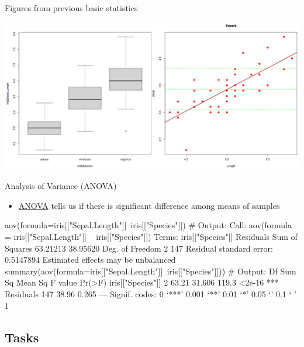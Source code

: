 \documentclass[compress, ucs, xelatex, 11pt, xcolor=svgnames, aspectratio=169,
	hyperref={
		bookmarks=true,
		unicode=true,
		colorlinks=true,
		pdftitle={Molecular data in R},
		plainpages=false,
		pdfauthor={Vojtech Zeisek},
		pdfsubject={Course about phylogeny and evolution in R},
		pdfcreator={XeLaTeX},
		pdfkeywords={R, evolution, phylogeny, molecular data},
		linkcolor=Crimson, %
		anchorcolor=Magenta, %
		citecolor=Magenta, %
		filecolor=Magenta, %
		menucolor=Magenta, %
		urlcolor=DodgerBlue, %
		pdftex},
	url={hyphens, lowtilde} %
	]{beamer}
\begin{document}
\begin{frame}{Figures from previous basic statistics}
	\begin{center}
		\includegraphics[width=\textwidth-2cm]{iris.png}
	\end{center}
\end{frame}

\begin{frame}[fragile]{Analysis of Variance (ANOVA)}
	\begin{itemize}
		\item \href{https://en.wikipedia.org/wiki/Analysis_of_variance}{ANOVA} tells us if there is significant difference among means of samples
	\end{itemize}
	\begin{spluscode}
    aov(formula=iris[["Sepal.Length"]]~iris[["Species"]]) # Output:
    Call:
       aov(formula = iris[["Sepal.Length"]] ~ iris[["Species"]])
    Terms:
                    iris[["Species"]] Residuals
    Sum of Squares           63.21213  38.95620
    Deg. of Freedom                 2       147
    Residual standard error: 0.5147894
    Estimated effects may be unbalanced
    summary(aov(formula=iris[["Sepal.Length"]]~iris[["Species"]])) # Output:
                       Df Sum Sq Mean Sq F value Pr(>F)    
    iris[["Species"]]   2  63.21  31.606   119.3 <2e-16 ***
    Residuals         147  38.96   0.265                   
    ---
    Signif. codes:  0 ‘***’ 0.001 ‘**’ 0.01 ‘*’ 0.05 ‘.’ 0.1 ‘ ’ 1
	\end{spluscode}
\end{frame}

\subsection{Tasks}
\end{document}
